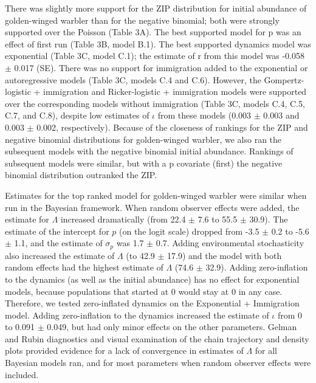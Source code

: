 \documentclass[12pt]{article}
\begin{document}
There was slightly more support for the ZIP distribution for initial
abundance of golden-winged warbler than for the negative binomial; both were strongly
supported over the Poisson (Table 3A). The best
supported model for p was an effect of first run (Table 3B, model
B.1). The best supported dynamics model was exponential
(Table 3C, model C.1); the estimate of r from this model was -0.058
$\pm$ 0.017 (SE). There was no support for immigration added to the
exponential or autoregressive models (Table 3C, models C.4 and
C.6).
However, the Gompertz-logistic + immigration and Ricker-logistic + immigration
models were supported over the corresponding models without immigration
(Table 3C, models C.4, C.5, C.7, and C.8), despite low estimates
of $\iota$ from these models (0.003 $\pm$ 0.003 and 0.003 $\pm$
0.002, respectively).  
Because of the closeness of rankings for the ZIP and negative binomial
distributions for golden-winged warbler, we also ran the subsequent models with the
negative binomial initial abundance. Rankings of subsequent
models were similar, but with a p covariate (first) the negative
binomial distribution outranked the ZIP.

Estimates for the top ranked model for golden-winged warbler
were similar when run in the Bayesian framework. When random
observer effects were added, the estimate for $\Lambda$ increased dramatically
(from 22.4 $\pm$ 7.6 to 55.5 $\pm$ 30.9). The estimate of the intercept
for $p$ (on the logit scale) dropped from -3.5 $\pm$ 0.2 to -5.6 $\pm$ 1.1, and the
estimate of $\sigma_p$ was 1.7 $\pm$ 0.7. Adding environmental stochasticity
also increased the estimate of $\Lambda$ (to 42.9 $\pm$ 17.9) and the model with
both random effects had the highest estimate of $\Lambda$ (74.6 $\pm$ 32.9). 
Adding zero-inflation to the dynamics (as well as
the initial abundance) has no effect for exponential models, because populations
that started at 0 would stay at 0 in any case. Therefore, we tested
zero-inflated dynamics on the Exponential + Immigration model. Adding zero-inflation to the dynamics
increased the estimate of $\iota$ from 0 to 0.091 $\pm$ 0.049, but had only minor
effects on the other parameters. Gelman and Rubin diagnostics and visual
examination of the chain trajectory and density plots provided evidence for a lack of convergence in
estimates of $\Lambda$ for all Bayesian models ran, and for most parameters when random observer
effects were included.
\end{document}
